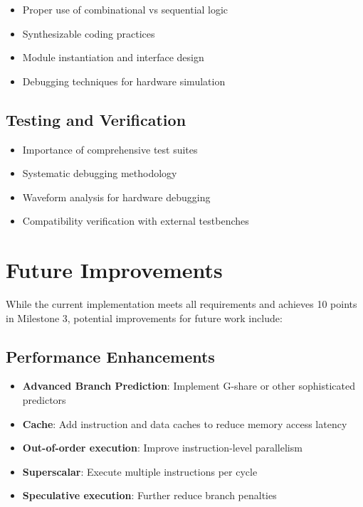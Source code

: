 \begin{itemize}
    \item Proper use of combinational vs sequential logic
    \item Synthesizable coding practices
    \item Module instantiation and interface design
    \item Debugging techniques for hardware simulation
\end{itemize}

\subsection{Testing and Verification}

\begin{itemize}
    \item Importance of comprehensive test suites
    \item Systematic debugging methodology
    \item Waveform analysis for hardware debugging
    \item Compatibility verification with external testbenches
\end{itemize}

\section{Future Improvements}

While the current implementation meets all requirements and achieves 10 points in Milestone 3, potential improvements for future work include:

\subsection{Performance Enhancements}

\begin{itemize}
    \item \textbf{Advanced Branch Prediction}: Implement G-share or other sophisticated predictors
    \item \textbf{Cache}: Add instruction and data caches to reduce memory access latency
    \item \textbf{Out-of-order execution}: Improve instruction-level parallelism
    \item \textbf{Superscalar}: Execute multiple instructions per cycle
    \item \textbf{Speculative execution}: Further reduce branch penalties
\end{itemize}

